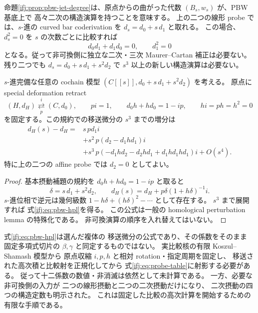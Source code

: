 命題\ref{ifj:prop:pbw-jet-degree}は、原点からの曲がった代数
$(B_s,w_s)$ が、PBW 基底上で
高々二次の構造演算を持つことを意味する。
上の二つの線形 probe では、$s$-進の
curved bar coderivation を $d_s=d_0+s\,d_1$ と取れる。
この場合、$d_s^2=0$ を $s$ の次数ごとに比較すれば
\[
 d_0d_1+d_1d_0=0,\qquad d_1^2=0
\]
となる。従って非可換側に独立な二次・三次
Maurer--Cartan 補正は必要ない。
残り二つでも $d_s=d_0+s\,d_1+s^2d_2$ で
$s^3$ 以上の新しい構造演算は必要ない。

\begin{lemma}[固定収縮による三次までの摂動移送]
\label{ifj:lem:pbw-hpl}
$s$-進完備な任意の cochain 模型
$(C[[s]],d_0+s\,d_1+s^2d_2)$ を考える。
原点に special deformation retract
\[
 (H,d_H)\underset{p}{\overset{i}{\rightleftarrows}}
 (C,d_0),\qquad
 pi=1,\qquad d_0h+hd_0=1-ip,\qquad
 hi=ph=h^2=0
\]
を固定する。この規約での移送微分の $s^3$ までの増分は
\begin{equation}\label{ifj:eq:pbw-hpl}
\begin{aligned}
 d_H(s)-d_H
  ={}&s\,p d_1i\\
   &+s^2\,p(d_2-d_1hd_1)i\\
   &+s^3\,p(-d_1hd_2-d_2hd_1+d_1hd_1hd_1)i
     +O(s^4).
\end{aligned}
\end{equation}
特に上の二つの affine probe では $d_2=0$ としてよい。
\end{lemma}

\begin{proof}
基本摂動補題の規約を
$d_0h+hd_0=1-ip$ と取ると
\[
 \delta=s\,d_1+s^2d_2,\qquad
 d_H(s)=d_H+p\delta(1+h\delta)^{-1}i.
\]
$s$-進位相で逆元は幾何級数
$1-h\delta+(h\delta)^2-\cdots$ として存在する。
$s^3$ まで展開すれば
式\eqref{ifj:eq:pbw-hpl}を得る。
この公式は一般の homological perturbation lemma
\cite{IFJGLS1991}の特殊化である。
非可換演算の順序を入れ替えてはいない。
\end{proof}

\begin{remark}[計算が完了した範囲と次の入力]
\label{ifj:rem:pbw-transfer-scope}
式\eqref{ifj:eq:pbw-hpl}は選んだ複体の
移送微分の公式であり、その係数をそのまま
固定多項式切片の $\beta,\gamma$ と同定するものではない。
実比較核の有限 Koszul--Shamash 模型から
原点収縮 $i,p,h$ と相対 rotation・指定周期を固定し、
移送された高次積と比較射を正規化してから
式\eqref{ifj:eq:probe-table}に射影する必要がある。
従って十二係数の数値・非消滅は依然として未計算である。
一方、必要な非可換側の入力が
二つの線形摂動と二つの二次摂動だけになり、
二次摂動の四つの構造定数も明示された。
これは固定した比較の高次計算を開始するための有限な手順である。
\end{remark}

